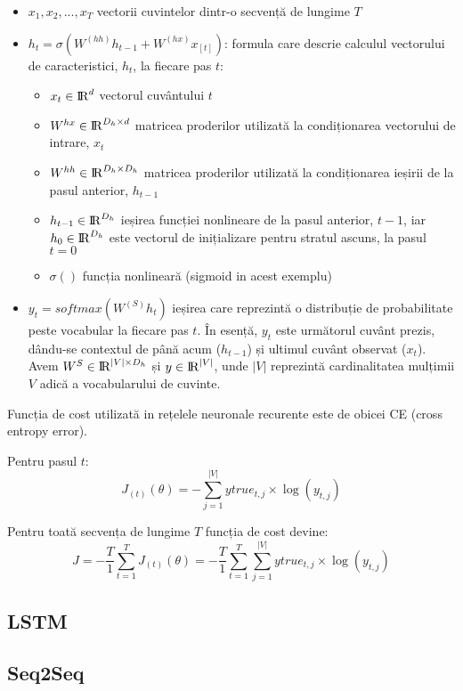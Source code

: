 \begin{itemize}
	\item $x_1, x_2, ..., x_T$ vectorii cuvintelor dintr-o secvență de lungime $T$
	\item $h_t = \sigma{(W^{(hh)} h_{t-1} + W^{(hx)} x_{[t]})}$: formula care descrie calculul vectorului de caracteristici, $h_t$, la fiecare pas $t$:
	
	\begin{itemize}
		\item $ x_t \in {\rm I\!R}^d $ vectorul cuvântului $t$
		\item $ W^{hx} \in {\rm I\!R}^{D_h \times d} $ matricea proderilor utilizată la condiționarea vectorului de intrare, $x_t$
		\item $ W^{hh} \in {\rm I\!R}^{D_h \times D_h} $ matricea proderilor utilizată la condiționarea ieșirii de la pasul anterior, $h_{t-1}$
		\item $ h_{t-1} \in  {\rm I\!R}^{D_h} $ ieșirea funcției nonlineare de la pasul anterior, $t-1$, iar $h_0 \in  {\rm I\!R}^{D_h}$ este vectorul de inițializare pentru stratul ascuns, la pasul $t=0$
		\item $ \sigma() $ funcția nonlineară  (sigmoid in acest exemplu)
	\end{itemize}

	\item $ y_t = softmax(W^{(S)} h_t) $ ieșirea care reprezintă o distribuție de probabilitate peste vocabular la fiecare pas $t$. În esență, $y_t$ este următorul cuvânt prezis, dându-se contextul de până  acum ($ h_{t-1} $) și ultimul cuvânt observat ($x_t$). Avem  $ W^{S} \in {\rm I\!R}^{|V| \times D_h} $ și $ y \in {\rm I\!R}^{|V|} $, unde $|V|$ reprezintă cardinalitatea mulțimii $V$ adică a vocabularului de cuvinte.

\end{itemize}

Funcția de cost utilizată in rețelele neuronale recurente este de obicei CE (cross entropy error).

Pentru pasul $t$:
$$
J_{(t)}(\theta) = - \sum_{j=1}^{|V|}  ytrue_{t, j} \times \log(y_{t, j})
$$

Pentru toată secvența de lungime $T$ funcția de cost devine:
$$
J = - \frac{T}{1} \sum_{t=1}^{T} J_{(t)}(\theta) = - \frac{T}{1} \sum_{t=1}^{T}  \sum_{j=1}^{|V|}  ytrue_{t, j} \times \log(y_{t, j})
$$

\cite{cs224d_notes}

\subsection{LSTM}



\subsection{Seq2Seq}